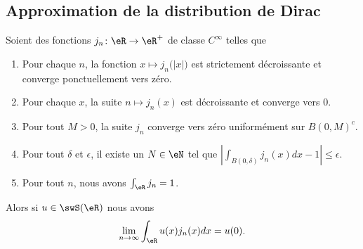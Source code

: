 \subsection{Approximation de la distribution de Dirac}


\begin{lemma}        \label{LEMooHEEOooFtKgfz}
	Soient des fonctions \( j_n\colon \eR\to \eR^+\) de classe \(  C^{\infty}\) telles que
	\begin{enumerate}
		\item
		      Pour chaque \( n\), la fonction \( x\mapsto j_n\big( | x | \big)\) est strictement décroissante et converge ponctuellement vers zéro.
		\item
		      Pour chaque \( x\), la suite \( n\mapsto j_n(x)\) est décroissante et converge vers \( 0\).
		\item       \label{ITEMooFQYXooEkUAIb}
		      Pour tout \( M>0\), la suite \( j_n\) converge vers zéro uniformément sur \( B(0,M)^c\).
		\item       \label{ITEMooFYCRooFeRRjE}
		      Pour tout \( \delta\) et \( \epsilon\), il existe un \( N\in \eN\) tel que \( | \int_{B(0,\delta)}j_n(x)dx-1 |\leq\epsilon\).
		\item
		      Pour tout \( n\), nous avons \( \int_{\eR}j_n=1\).
	\end{enumerate}
	Alors si \( u\in\swS(\eR)\) nous avons
	\begin{equation}
		\lim_{n\to \infty} \int_{\eR}u(x)j_n(x)dx=u(0).
	\end{equation}
\end{lemma}

